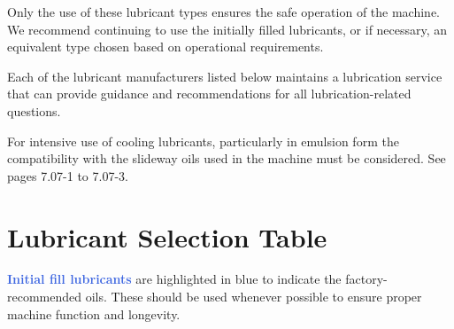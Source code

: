 \noindent Only the use of these lubricant types ensures the safe operation of the machine.  
We recommend continuing to use the initially filled lubricants, or if necessary, an equivalent type chosen based on operational requirements.


Each of the lubricant manufacturers listed below maintains a lubrication service that can provide guidance and recommendations for all lubrication-related questions.

For intensive use of cooling lubricants, particularly in emulsion form the compatibility with the slideway oils used in the machine must be considered. See pages 7.07-1 to 7.07-3.

\section{Lubricant Selection Table}

\textcolor{RoyalBlue}{\textbf{Initial fill lubricants}} are highlighted in blue to indicate the factory-recommended oils. These should be used whenever possible to ensure proper machine function and longevity.

